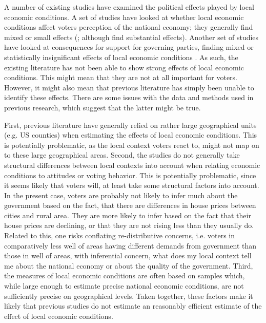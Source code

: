 \documentclass[12pt,a4paper]{article}
\begin{document}
A number of existing studies have examined the political effects played by local economic conditions. A set of studies have looked at whether local economic conditions affect voters perception of the national economy; they generally find mixed or small effects (\citealt{books1999contextual,reeves2012ecologies,anderson2011local,ansolabehere2014mecro}; although \citealt{dinesen2015reconsidering} find substantial effects). Another set of studies have looked at consequences for support for governing parties, finding mixed or statistically insignificant effects of local economic conditions \citep{hansford2015reevaluating,eisenberg2004economic,kim2003spatial}. As such, the existing literature has not been able to show strong effects of local economic conditions. This might mean that they are not at all important for voters. However, it might also mean that previous literature has simply been unable to identify these effects. There are some issues with the data and methods used in previous research, which suggest that the latter might be true.

First, previous literature have  generally relied on rather large geographical units (e.g. US counties) when estimating the effects of local economic conditions. This is potentially problematic, as the local context voters react to, might not map on to these large geographical areas. Second, the studies do not generally take structural differences between local contexts into account when relating economic conditions to  attitudes or voting behavior. This is potentially problematic, since it seems likely that voters will, at least take some structural factors into account. In the present case, voters are probably not likely to infer much about the government based on the fact, that there are differences in house prices between cities and rural area. They are more likely to infer based on the fact that their house prices are declining, or that they are not rising less than they usually do. Related to this, one risks conflating re-distributive concerns, i.e. voters in comparatively less well of areas having different demands from government than those in well of areas, with inferential concern, what does my local context tell me about the national economy or about the quality of the government.  Third, the measures of local economic conditions are often based on samples which, while large enough to estimate precise national economic conditions, are not sufficiently precise on geographical levels. Taken together, these factors make it likely that previous studies do not estimate an reasonably efficient estimate of the effect of local economic conditions. 
\end{document}
